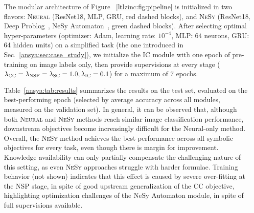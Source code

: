 %
The  modular architecture of Figure ~\ref{ltlzinc:fig:pipeline} is initialized in two flavors: \textsc{Neural} (ResNet18, MLP, GRU, red dashed blocks), and \textsc{NeSy} (ResNet18, Deep Problog~\cite{manhaeve2019deepproblog}, NeSy Automaton~\cite{umili2023grounding}, green dashed blocks).
After selecting optimal hyper-parameters (optimizer: Adam, learning rate: $10^{-4}$, MLP:  64 neurons, GRU: 64 hidden units) on a simplified task (the one introduced in Sec.~\ref{ansya:sec:case_study}), we initialize the \textsc{IC} module with one epoch of pre-training on image labels only, then provide supervisions at every stage ($\lambda_{\textsc{CC}} = \lambda_{\textsc{NSP}} = \lambda_{\textsc{SC}} = 1.0, \lambda_\textsc{IC} = 0.1$) for a maximum of 7 epochs. 


Table~\ref{ansya:tab:results} summarizes the results on the test set, evaluated on the best-performing epoch (selected by average accuracy across all modules, measured on the validation set). In general, it can be observed that, although both \textsc{Neural} and \textsc{NeSy} methods reach similar image classification performance, downstream objectives become increasingly difficult for the Neural-only method. Overall, the \textsc{NeSy} method achieves the best performance across all symbolic objectives for every task, even though there is margin for improvement. Knowledge availability can only partially compensate the challenging nature of this setting, as even \textsc{NeSy} approaches struggle with harder formulae. Training behavior (not shown)  indicates that this effect is caused by severe over-fitting at the \textsc{NSP} stage, in spite of good upstream generalization of the \textsc{CC} objective, highlighting optimization challenges of the NeSy Automaton module, in spite of full supervisions available.









\fi